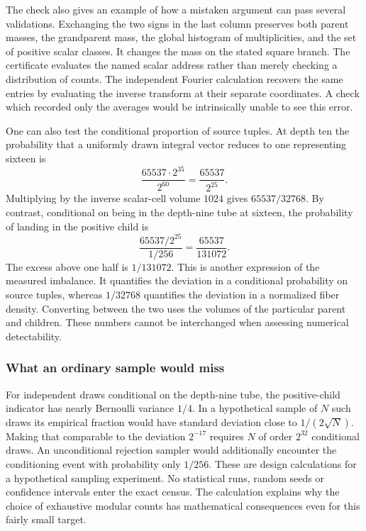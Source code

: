 \documentclass[12pt,letterpaper]{article}
\begin{document}
The check also gives an example of how a mistaken argument can pass several validations. Exchanging the two signs in the last column preserves both parent masses, the grandparent mass, the global histogram of multiplicities, and the set of positive scalar classes. It changes the mass on the stated square branch. The certificate evaluates the named scalar address rather than merely checking a distribution of counts. The independent Fourier calculation recovers the same entries by evaluating the inverse transform at their separate coordinates. A check which recorded only the averages would be intrinsically unable to see this error.

One can also test the conditional proportion of source tuples. At depth ten the probability that a uniformly drawn integral vector reduces to one representing sixteen is
\[
      \frac{65537\cdot2^{35}}{2^{60}}=\frac{65537}{2^{25}}.
\]
Multiplying by the inverse scalar-cell volume $1024$ gives $65537/32768$. By contrast, conditional on being in the depth-nine tube at sixteen, the probability of landing in the positive child is
\[
     \frac{65537/2^{25}}{1/256}=\frac{65537}{131072}.
\]
The excess above one half is $1/131072$. This is another expression of the measured imbalance. It quantifies the deviation in a conditional probability on source tuples, whereas $1/32768$ quantifies the deviation in a normalized fiber density. Converting between the two uses the volumes of the particular parent and children. These numbers cannot be interchanged when assessing numerical detectability.

\subsubsection{What an ordinary sample would miss}
For independent draws conditional on the depth-nine tube, the positive-child indicator has nearly Bernoulli variance $1/4$. In a hypothetical sample of $N$ such draws its empirical fraction would have standard deviation close to $1/(2\sqrt N)$. Making that comparable to the deviation $2^{-17}$ requires $N$ of order $2^{32}$ conditional draws. An unconditional rejection sampler would additionally encounter the conditioning event with probability only $1/256$. These are design calculations for a hypothetical sampling experiment. No statistical runs, random seeds or confidence intervals enter the exact census. The calculation explains why the choice of exhaustive modular counts has mathematical consequences even for this fairly small target.
\end{document}
